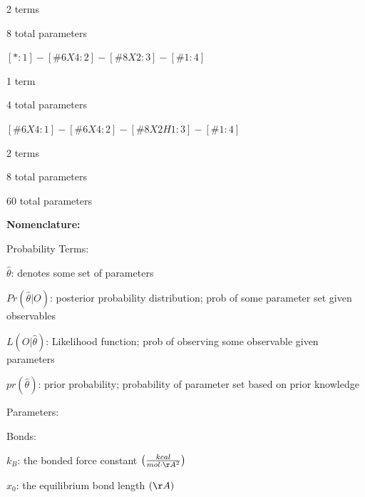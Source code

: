 \documentclass{report}
\begin{document}
\begin{outline}
\begin{outline}
\begin{outline}
\begin{outline}
            \item{2 terms}
            \item{8 total parameters}
          \end{outline}
        \item{$[*:1]-[\#6X4:2]-[\#8X2:3]-[\#1:4]$}
          \begin{outline}
            \item{1 term}
            \item{4 total parameters}
          \end{outline}
        \item{$[\#6X4:1]-[\#6X4:2]-[\#8X2H1:3]-[\#1:4]$}
          \begin{outline}
            \item{2 terms}
            \item{8 total parameters}
          \end{outline}  
      \end{outline}
    \item{60 total parameters}
  \end{outline}
  \item{\bf Nomenclature:}
    \begin{outline}
    \item{Probability Terms:}
      \begin{outline}
        \item{$\hat{\theta}$: denotes some set of parameters}
        \item{$Pr\left(\hat{\theta}|O \right)$: posterior probability distribution; prob of some parameter set given observables}
        \item{$L\left(O|\hat{\theta} \right)$: Likelihood function; prob of observing some observable given parameters}
        \item{$pr\left(\hat{\theta} \right)$: prior probability; probability of parameter set based on prior knowledge}
      \end{outline}
    \item{Parameters:}
      \begin{outline}
        \item{Bonds:}
          \begin{outline}
            \item{$k_{B}$: the bonded force constant $\left(\frac{kcal}{mol \cdot \AA^2} \right)$}
            \item{$x_0$: the equilibrium bond length $\left(\AA \right)$}
          \end{outline}

\end{outline}
\end{outline}
\end{outline}
\end{document}
